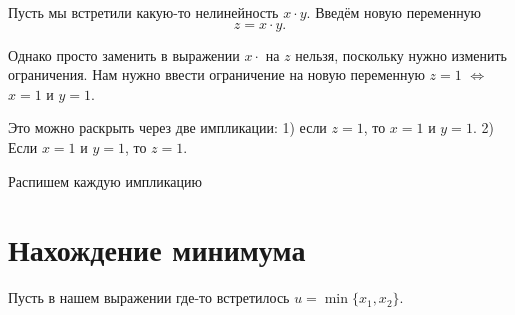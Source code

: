 Пусть мы встретили какую-то нелинейность $x \cdot y$. Введём новую переменную
\[
	z = x \cdot y.
\]

Однако просто заменить в выражении $x \cdot$ на $z$ нельзя, поскольку нужно изменить ограничения. Нам нужно ввести ограничение на новую переменную $z = 1$ $\Longleftrightarrow$ $x = 1$ и $y = 1$.

Это можно раскрыть через две импликации: 1) если $z = 1$, то $x = 1$ и $y = 1$. 2) Если $x = 1$ и $y = 1$, то $z = 1$.

Распишем каждую импликацию

\section{Нахождение минимума}

Пусть в нашем выражении где-то встретилось $u = \min\{x_1, x_2\}$.
